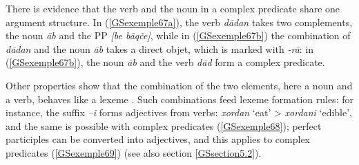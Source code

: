 \documentclass[output=paper]{langsci/langscibook}
\begin{document}
{\begin{exe}
	\ex \label{GSexemple66} 
	\begin{xlist}
        \label{GSexemple66a}
		
	    \label{GSexemple66b}
		
		\end{xlist}
\end{exe}

There is evidence that the verb and the noun in a complex predicate share one argument structure. In (\ref{GSexemple67a}), the verb \textit{d\=adan} takes two complements, the noun \textit{\=ab} and the PP \textit{[be b\=aq\v ce]}, while in (\ref{GSexemple67b}) the combination of \textit{d\=adan} and the noun \textit{\=ab} takes a direct objet, which is marked with \textit{-r\=a}: in (\ref{GSexemple67b}), the noun \textit{\=ab} and the verb \textit{d\=ad} form a complex predicate.  

\begin{exe}
	\ex \label{GSexemple67} 
	\begin{xlist}
        \label{GSexemple67a}
		
	    \label{GSexemple67b}
		
		\end{xlist}
\end{exe}

Other properties show that the combination of the two elements, here a noun and a verb, behaves like a lexeme \citep{bonami2010persian}. Such combinations feed lexeme formation rules: for instance, the suffix \textit{–i} forms adjectives from verbs: \textit{xordan} `eat' > \textit{xordani} `edible', and the same is possible with complex predicates (\ref{GSexemple68}); perfect participles can be converted into adjectives, and this applies to complex predicates (\ref{GSexemple69}) (see also section \ref{GSsection5.2}).

}
\end{document}
